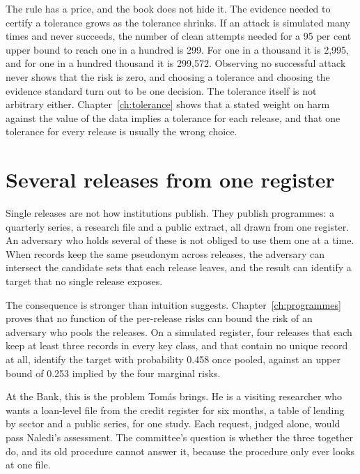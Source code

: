 The rule has a price, and the book does not hide it. The evidence needed to certify a
tolerance grows as the tolerance shrinks. If an attack is simulated many times and never
succeeds, the number of clean attempts needed for a 95 per cent upper bound to reach one in
a hundred is 299. For one in a thousand it is 2,995, and for one in a hundred thousand it is
299,572.
Observing no successful attack never shows that the risk is zero, and choosing a tolerance
and choosing the evidence standard turn out to be one decision. The tolerance itself is not
arbitrary either. Chapter~\ref{ch:tolerance} shows that a stated weight on harm against the
value of the data implies a tolerance for each release, and that one tolerance for every
release is usually the wrong choice.

\section{Several releases from one register}

Single releases are not how institutions publish. They publish programmes: a quarterly
series, a research file and a public extract, all drawn from one register. An adversary who
holds several of these is not obliged to use them one at a time. When records keep the same
pseudonym across releases, the adversary can intersect the candidate sets that each release
leaves, and the result can identify a target that no single release exposes.

The consequence is stronger than intuition suggests. Chapter~\ref{ch:programmes} proves that
no function of the per-release risks can bound the risk of an adversary who pools the
releases. On a simulated register, four releases that each keep at least three records in
every key class, and that contain no unique record at all, identify the target with
probability 0.458 once pooled, against an upper bound of 0.253 implied by the four marginal
risks.

At the Bank, this is the problem Tomás brings. He is a visiting researcher who wants a
loan-level file from the credit register for six months, a table of lending by sector and a
public series, for one study. Each request, judged alone, would pass Naledi's assessment. The
committee's question is whether the three together do, and its old procedure cannot answer
it, because the procedure only ever looks at one file.

